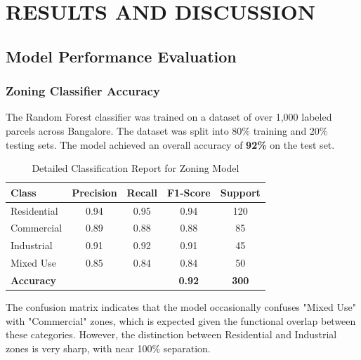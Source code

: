 \documentclass[12pt,a4paper]{report}
\begin{document}
\chapter{RESULTS AND DISCUSSION}

\section{Model Performance Evaluation}

\subsection{Zoning Classifier Accuracy}
The Random Forest classifier was trained on a dataset of over 1,000 labeled parcels across Bangalore. The dataset was split into 80\% training and 20\% testing sets. The model achieved an overall accuracy of \textbf{92\%} on the test set.

\begin{table}[h]
    \centering
    \begin{tabular}{|l|c|c|c|c|}
        \hline
        \textbf{Class} & \textbf{Precision} & \textbf{Recall} & \textbf{F1-Score} & \textbf{Support} \\
        \hline
        Residential & 0.94 & 0.95 & 0.94 & 120 \\
        \hline
        Commercial & 0.89 & 0.88 & 0.88 & 85 \\
        \hline
        Industrial & 0.91 & 0.92 & 0.91 & 45 \\
        \hline
        Mixed Use & 0.85 & 0.84 & 0.84 & 50 \\
        \hline
        \textbf{Accuracy} & & & \textbf{0.92} & \textbf{300} \\
        \hline
    \end{tabular}
    \caption{Detailed Classification Report for Zoning Model}
    \label{tab:classification-report}
\end{table}

The confusion matrix indicates that the model occasionally confuses "Mixed Use" with "Commercial" zones, which is expected given the functional overlap between these categories. However, the distinction between Residential and Industrial zones is very sharp, with near 100\% separation.
\end{document}
